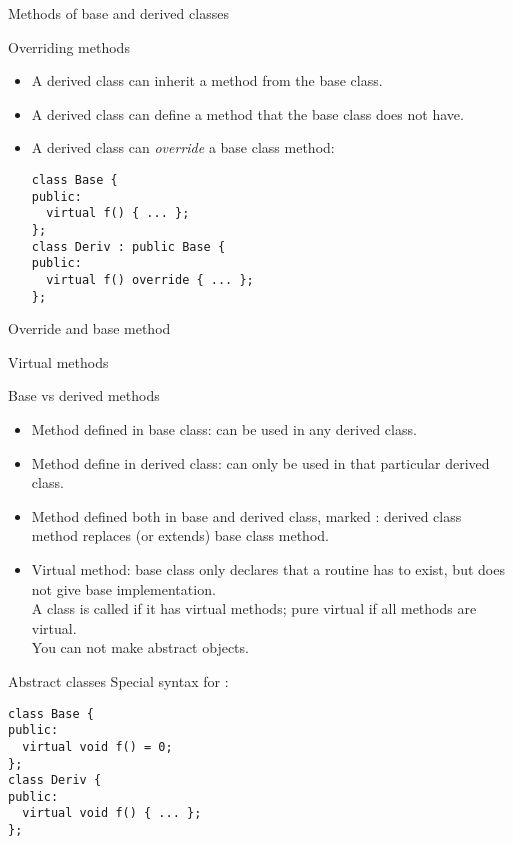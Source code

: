  {Methods of base and derived classes}
\label{sec:derive-method}

\begin{block}{Overriding methods}
  \label{sl:obj-method-override}
  \begin{itemize}
  \item A derived class can inherit a method from the base class.
  \item A derived class can define a method that the base class does
    not have.
  \item A derived class can \emph{override} a
    base class method:
\begin{lstlisting}
class Base {
public:
  virtual f() { ... };
};
class Deriv : public Base {
public:
  virtual f() override { ... };
};
\end{lstlisting}
  \end{itemize}
\end{block}

\begin{block}{Override and base method}
  \label{sl:virtualoverride}
\end{block}

 {Virtual methods}

\begin{block}{Base vs derived methods}
  \begin{itemize}
  \item Method defined in base class: can be used in any derived class.
  \item Method define in derived class: can only be used in that
    particular derived class.
  \item Method defined both in base and derived class, marked
    : derived class method replaces (or extends)
    base class method.
  \item Virtual method: base class only declares that a routine has to
    exist, but does not give base implementation.\\ A class is called
     if it has virtual methods; pure
    virtual if all methods are virtual.\\ You can not make abstract objects.
  \end{itemize}  
\end{block}

\begin{block}{Abstract classes}
  Special syntax for :
\begin{lstlisting}
class Base {
public:
  virtual void f() = 0;
};
class Deriv {
public:
  virtual void f() { ... };
};
\end{lstlisting}
\end{block}

